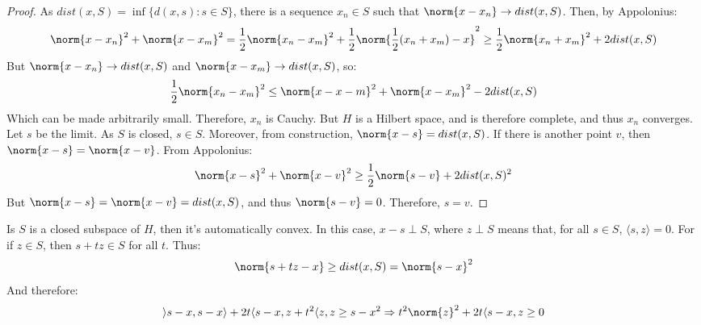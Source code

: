 \documentclass[crop=false,class=article,oneside]{standalone}
\begin{document}
            \begin{proof}
                As $dist(x,S)=\inf\{d(x,s):s\in{S}\}$, there is
                a sequence $x_{n}\in{S}$ such that
                $\norm{x-x_{n}}\rightarrow{dist(x,S)}$. Then, by
                Appolonius:
                \begin{equation*}
                    \norm{x-x_{n}}^{2}+\norm{x-x_{m}}^{2}
                    =\frac{1}{2}\norm{x_{n}-x_{m}}^{2}
                    +\frac{1}{2}\norm{\frac{1}{2}(x_{n}+x_{m})-x}^{2}
                    \geq\frac{1}{2}\norm{x_{n}+x_{m}}^{2}
                    +2dist(x,S)
                \end{equation*}
                But $\norm{x-x_{n}}\rightarrow{dist(x,S)}$ and
                $\norm{x-x_{m}}\rightarrow{dist(x,S)}$, so:
                \begin{equation*}
                    \frac{1}{2}\norm{x_{n}-x_{m}}^{2}
                    \leq\norm{x-x-{m}}^{2}
                    +\norm{x-x_{m}}^{2}-2dist(x,S)
                \end{equation*}
                Which can be made arbitrarily small. Therefore,
                $x_{n}$ is Cauchy. But $H$ is a Hilbert space, and
                is therefore complete, and thus $x_{n}$ converges.
                Let $s$ be the limit. As $S$ is closed, $s\in{S}$.
                Moreover, from construction,
                $\norm{x-s}=dist(x,S)$. If there is another point
                $v$, then $\norm{x-s}=\norm{x-v}$. From
                Appolonius:
                \begin{equation*}
                    \norm{x-s}^{2}+\norm{x-v}^{2}
                    \geq\frac{1}{2}\norm{s-v}+2dist(x,S)^{2}
                \end{equation*}
                But $\norm{x-s}=\norm{x-v}=dist(x,S)$, and
                thus $\norm{s-v}=0$. Therefore, $s=v$.
            \end{proof}
            Is $S$ is a closed subspace of $H$, then it's
            automatically convex. In this case, $x-s\perp{S}$,
            where $z\perp{S}$ means that, for all
            $s\in{S}$, $\langle{s,z}\rangle=0$. For if
            $z\in{S}$, then $s+tz\in{S}$ for all $t$. Thus:
            \begin{equation*}
                \norm{s+tz-x}\geq{dist(x,S)}=\norm{s-x}^{2}
            \end{equation*}
            And therefore:
            \begin{equation*}
                \rangle{s-x,s-x}\rangle+2t\langle{s-x,z}
                +t^{2}\langle{z,z}\geq{s-x}^{2}
                \Rightarrow{t^{2}\norm{z}^{2}+2t\langle{s-x,z}}
                \geq{0}
            \end{equation*}
\end{document}
